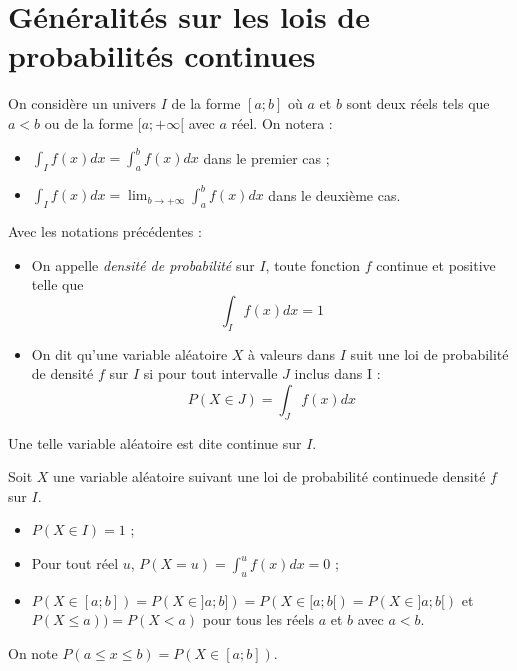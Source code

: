 \documentclass[french]{book}
\newcommand{\dx}{dx}
\begin{document}
\tableofcontents



\section{Généralités sur les lois de probabilités continues}

\begin{rem}
 On considère un univers $I$ de la forme $[a;b]$ où $a$ et $b$ sont deux réels tels que $a<b$ ou de la forme $[a;+\infty[$ avec $a$ réel. 
On notera :
\begin{itemize}
 \item[$\bullet$] $\int_{I}f(x)\dx=\int_a^bf (x)\dx$ dans le premier cas ;
  \item[$\bullet$] $\int_{I}f(x)\dx=\lim_{b\rightarrow +\infty}\int_{a}^{b}f(x)\dx$ dans le deuxième cas.
\end{itemize}
\end{rem}


\begin{defn}
Avec les notations précédentes :
\begin{itemize}
\item[$\bullet$] On appelle \emph{densité de probabilité} sur $I$, toute fonction $f$ continue et positive telle que 
$$\int_{I}f(x)\dx=1$$
\item[$\bullet$] On dit qu'une variable aléatoire $X$ à valeurs dans $I$ suit une loi de probabilité de densité $f$ sur $I$ si pour tout intervalle $J$ inclus dans I : 
$$P(X\in J)=\int_{J}f(x)\dx$$
\end{itemize}
Une telle variable aléatoire est dite continue sur $I$.
\end{defn}

\begin{prop}
 Soit $X$ une variable aléatoire suivant une loi de probabilité continuede densité $f$ sur $I$.
\begin{itemize}
 \item[$\bullet$] $P(X\in I)=1$ ;
\item[$\bullet$] Pour tout réel $u$, $P(X=u)=\int_{u}^{u}f(x)\dx=0$ ;
\item[$\bullet$] $P(X\in[a;b])=P(X\in]a;b])=P(X\in[a;b[)=P(X\in]a;b[)$ et $P(X\leq a))=P(X<a)$ pour tous les réels $a$ et $b$ avec $a<b$.
\end{itemize}

\end{prop}

\begin{rem}
 On note $P(a\leq x\leq b)=P(X\in [a;b])$.
\end{rem}
\end{document}
